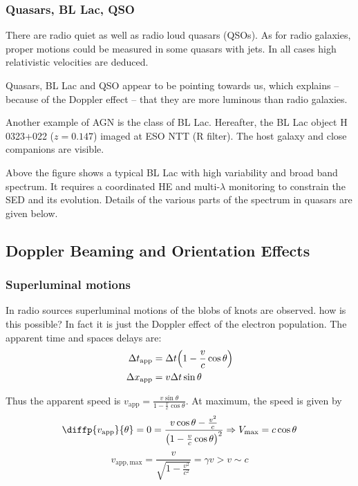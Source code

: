\documentclass[10pt,a4paper,english]{article}
\let\originalleft\left
\let\originalright\right
\renewcommand{\left}{\mathopen{}\mathclose\bgroup\originalleft}
\renewcommand{\right}{\aftergroup\egroup\originalright}
\begin{document}
\subsubsection{Quasars, BL Lac, QSO}

There are radio quiet as well as radio loud quasars (QSOs). As for radio
galaxies, proper motions could be measured in some quasars with jets. In all
cases high relativistic velocities are deduced.

Quasars, BL Lac and QSO appear to be pointing towards us, which explains --
because of the Doppler effect -- that they are more luminous than radio
galaxies.


Another example of AGN is the class of BL Lac. Hereafter, the BL Lac object H
0323+022 ($z = 0.147$) imaged at ESO NTT (R filter). The host galaxy and close
companions are visible.

Above the figure shows a typical BL Lac with high variability and broad band
spectrum. It requires a coordinated HE and multi-$\lambda$ monitoring to
constrain the SED and its evolution. Details of the various parts of the
spectrum in quasars are given below.

\subsection{Doppler Beaming and Orientation Effects}

\subsubsection{Superluminal motions}

In radio sources superluminal motions of the blobs of knots are observed. how
is this possible? In fact it is just the Doppler effect of the electron
population. The apparent time and spaces delays are:
\begin{align}
    \Delta t_\mathrm{app} & = \Delta t \left( 1 - \frac{v}{c}\cos{\theta}\right)  \\
    \Delta x_\mathrm{app} &= v\Delta t\sin\theta
\end{align}

Thus the apparent speed is $v_\mathrm{app} = \frac{v\sin\theta}{1 - \frac{v}{c
}\cos{\theta}}$. At maximum, the speed is given by
\begin{equation}
    \diffp{v_\mathrm{app}}{\theta} = 0 = \frac{v\cos{\theta} - \frac{v^2}{c }}{\left( 1 - \frac{v }{c} \cos\theta \right)^2} \Rightarrow V_\mathrm{max} = c\cos{\theta}
\end{equation}
\begin{equation}
    v_\mathrm{app,max} = \frac{v}{\sqrt{1 - \frac{v^2}{c^2}}} = \gamma v > v \sim c
\end{equation}
\end{document}
